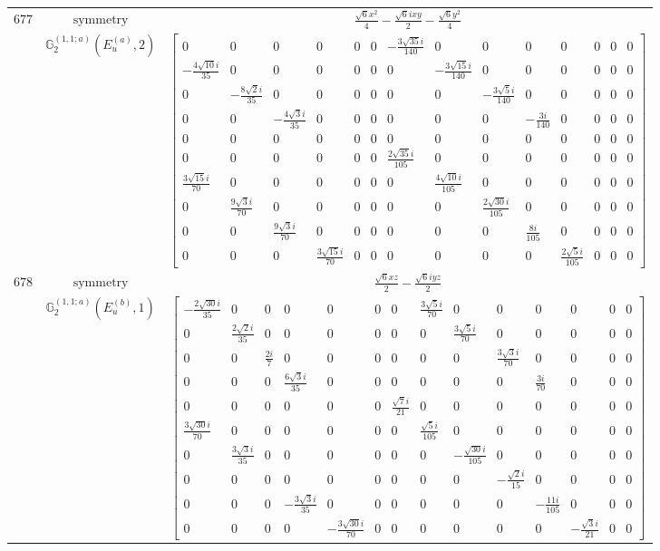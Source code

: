 \documentclass[fleqn,8pt,landscape]{jsarticle}
\begin{document}
\begin{longtable}{ccc}
$ 677 $ & $ \text{symmetry} $ & $ \frac{\sqrt{6} x^{2}}{4} - \frac{\sqrt{6} i x y}{2} - \frac{\sqrt{6} y^{2}}{4} $ \\
$  $ & $ \mathbb{G}_{2}^{(1,1;a)}(E_{u}^{(a)},2) $ & $ \begin{bmatrix} 0 & 0 & 0 & 0 & 0 & 0 & - \frac{3 \sqrt{35} i}{140} & 0 & 0 & 0 & 0 & 0 & 0 & 0 \\ - \frac{4 \sqrt{10} i}{35} & 0 & 0 & 0 & 0 & 0 & 0 & - \frac{3 \sqrt{15} i}{140} & 0 & 0 & 0 & 0 & 0 & 0 \\ 0 & - \frac{8 \sqrt{2} i}{35} & 0 & 0 & 0 & 0 & 0 & 0 & - \frac{3 \sqrt{5} i}{140} & 0 & 0 & 0 & 0 & 0 \\ 0 & 0 & - \frac{4 \sqrt{3} i}{35} & 0 & 0 & 0 & 0 & 0 & 0 & - \frac{3 i}{140} & 0 & 0 & 0 & 0 \\ 0 & 0 & 0 & 0 & 0 & 0 & 0 & 0 & 0 & 0 & 0 & 0 & 0 & 0 \\ 0 & 0 & 0 & 0 & 0 & 0 & \frac{2 \sqrt{35} i}{105} & 0 & 0 & 0 & 0 & 0 & 0 & 0 \\ \frac{3 \sqrt{15} i}{70} & 0 & 0 & 0 & 0 & 0 & 0 & \frac{4 \sqrt{10} i}{105} & 0 & 0 & 0 & 0 & 0 & 0 \\ 0 & \frac{9 \sqrt{3} i}{70} & 0 & 0 & 0 & 0 & 0 & 0 & \frac{2 \sqrt{30} i}{105} & 0 & 0 & 0 & 0 & 0 \\ 0 & 0 & \frac{9 \sqrt{3} i}{70} & 0 & 0 & 0 & 0 & 0 & 0 & \frac{8 i}{105} & 0 & 0 & 0 & 0 \\ 0 & 0 & 0 & \frac{3 \sqrt{15} i}{70} & 0 & 0 & 0 & 0 & 0 & 0 & \frac{2 \sqrt{5} i}{105} & 0 & 0 & 0 \end{bmatrix} $ \\ \hline
$ 678 $ & $ \text{symmetry} $ & $ \frac{\sqrt{6} x z}{2} - \frac{\sqrt{6} i y z}{2} $ \\
$  $ & $ \mathbb{G}_{2}^{(1,1;a)}(E_{u}^{(b)},1) $ & $ \begin{bmatrix} - \frac{2 \sqrt{30} i}{35} & 0 & 0 & 0 & 0 & 0 & 0 & \frac{3 \sqrt{5} i}{70} & 0 & 0 & 0 & 0 & 0 & 0 \\ 0 & \frac{2 \sqrt{2} i}{35} & 0 & 0 & 0 & 0 & 0 & 0 & \frac{3 \sqrt{5} i}{70} & 0 & 0 & 0 & 0 & 0 \\ 0 & 0 & \frac{2 i}{7} & 0 & 0 & 0 & 0 & 0 & 0 & \frac{3 \sqrt{3} i}{70} & 0 & 0 & 0 & 0 \\ 0 & 0 & 0 & \frac{6 \sqrt{3} i}{35} & 0 & 0 & 0 & 0 & 0 & 0 & \frac{3 i}{70} & 0 & 0 & 0 \\ 0 & 0 & 0 & 0 & 0 & 0 & \frac{\sqrt{7} i}{21} & 0 & 0 & 0 & 0 & 0 & 0 & 0 \\ \frac{3 \sqrt{30} i}{70} & 0 & 0 & 0 & 0 & 0 & 0 & \frac{\sqrt{5} i}{105} & 0 & 0 & 0 & 0 & 0 & 0 \\ 0 & \frac{3 \sqrt{3} i}{35} & 0 & 0 & 0 & 0 & 0 & 0 & - \frac{\sqrt{30} i}{105} & 0 & 0 & 0 & 0 & 0 \\ 0 & 0 & 0 & 0 & 0 & 0 & 0 & 0 & 0 & - \frac{\sqrt{2} i}{15} & 0 & 0 & 0 & 0 \\ 0 & 0 & 0 & - \frac{3 \sqrt{3} i}{35} & 0 & 0 & 0 & 0 & 0 & 0 & - \frac{11 i}{105} & 0 & 0 & 0 \\ 0 & 0 & 0 & 0 & - \frac{3 \sqrt{30} i}{70} & 0 & 0 & 0 & 0 & 0 & 0 & - \frac{\sqrt{3} i}{21} & 0 & 0 \end{bmatrix} $ \\ \hline

\end{longtable}
\end{document}
